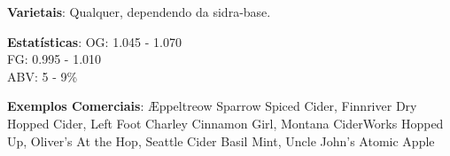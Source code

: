 \textbf{Varietais}: Qualquer, dependendo da sidra-base.

\textbf{Estatísticas}: OG: 1.045 - 1.070 \\
\phantom{ } \hspace{16.5mm} FG: 0.995 - 1.010 \\
\phantom{ } \hspace{16.5mm} ABV: 5 - 9\%

\textbf{Exemplos Comerciais}: Æppeltreow Sparrow Spiced Cider, Finnriver Dry Hopped Cider, Left Foot Charley Cinnamon Girl, Montana CiderWorks Hopped Up, Oliver's At the Hop, Seattle Cider Basil Mint, Uncle John's Atomic Apple